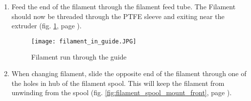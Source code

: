 \begin{enumerate}
\item Feed the end of the filament through the filament feed tube. The Filament should now be threaded through the PTFE sleeve and exiting near the extruder (fig. \ref{fig:filament_in_guide}, page \pageref{fig:filament_in_guide}).

\begin{figure}[H]
\centering
\texttt{[image: filament\_in\_guide.JPG]}
\caption{Filament run through the guide}
\label{fig:filament_in_guide}
\end{figure}

\item When changing filament, slide the opposite end of the filament through one of the holes in hub of the filament spool. This will keep the filament from unwinding from the spool (fig. \ref{fig:filament_spool_mount_front}, page \pageref{fig:filament_spool_mount_front}).

\end{enumerate}
